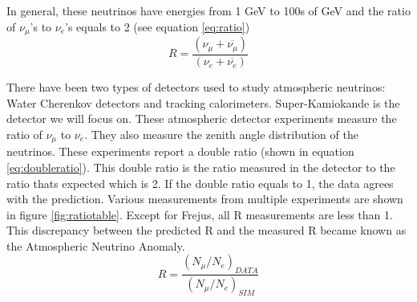 In general, these neutrinos have energies from 1 GeV to 100s of GeV and the ratio of $\nu_{\mu}$'s to $\nu_{e}$'s equals to 2 (see equation \ref{eq:ratio})
\begin{equation}
\label{eq:ratio}
R = \frac{(\nu_{\mu} + \overline{\nu_{\mu}})}{(\nu_{e} + \overline{\nu_{e}})}
\end{equation} 


There have been two types of detectors used to study atmospheric neutrinos: Water Cherenkov detectors and tracking calorimeters. Super-Kamiokande is the detector we will focus on. These atmospheric detector experiments measure the ratio of $\nu_{\mu}$ to $\nu_{e}$. They also measure the zenith angle distribution of the neutrinos. These experiments report a double ratio (shown in equation \ref{eq:doubleratio}). This double ratio is the ratio measured in the detector to the ratio thats expected which is 2. If the double ratio equals to 1, the data agrees with the prediction. Various measurements from multiple experiments are shown in figure \ref{fig:ratiotable}. Except for Frejus, all R measurements are less than 1. This discrepancy between the predicted R and the measured R became known as the Atmospheric Neutrino Anomaly.
\begin{equation}
\label{eq:doubleratio}
R = \frac{(N_{\mu}/N_{e})_{DATA}}{(N_{\mu}/N_{e})_{SIM}}
\end{equation}

\begin{table}[htp!]
\centering
\caption{Measurments of the double ratio for various atmospheric neutrino experiments}
\label{fig:ratiotable}
\end{table}

